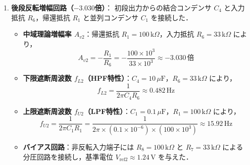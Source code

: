 \begin{enumerate}
  \item \textbf{後段反転増幅回路（$-3.030$倍）}：
        初段出力からの結合コンデンサ $C_4$ と入力抵抗 $R_6$，帰還抵抗 $R_1$ と並列コンデンサ $C_1$ を接続した．
        \begin{itemize}
          \item \textbf{中域理論増幅率 $A_{v2}$}：帰還抵抗 $R_1 = 100\,\mathrm{k}\Omega$，入力抵抗 $R_6 = 33\,\mathrm{k}\Omega$ により，
                \begin{equation}
                  A_{v2} = -\frac{R_1}{R_6} = -\frac{100 \times 10^3}{33 \times 10^3} \approx -3.030\,\text{倍}
                  \label{eq:gain2}
                \end{equation}
          \item \textbf{下限遮断周波数 $f_{L2}$（HPF特性）}：$C_4 = 10\,\mu\mathrm{F}$，$R_6 = 33\,\mathrm{k}\Omega$ により，
                \begin{equation}
                  f_{L2} = \frac{1}{2\pi C_4 R_6} \approx 0.482\,\mathrm{Hz}
                  \label{eq:fl2}
                \end{equation}
          \item \textbf{上限遮断周波数 $f_{U2}$（LPF特性）}：$C_1 = 0.1\,\mu\mathrm{F}$，$R_1 = 100\,\mathrm{k}\Omega$ により，
                \begin{equation}
                  f_{U2} = \frac{1}{2\pi C_1 R_1} = \frac{1}{2\pi \times (0.1 \times 10^{-6}) \times (100 \times 10^3)} \approx 15.92\,\mathrm{Hz}
                  \label{eq:fu2}
                \end{equation}
          \item \textbf{バイアス回路}：非反転入力端子には $R_8 = 100\,\mathrm{k}\Omega$ と $R_7 = 33\,\mathrm{k}\Omega$ による分圧回路を接続し，基準電位 $V_{\mathrm{ref2}} \approx 1.24\,\mathrm{V}$ を与えた．
        \end{itemize}


\end{enumerate}
